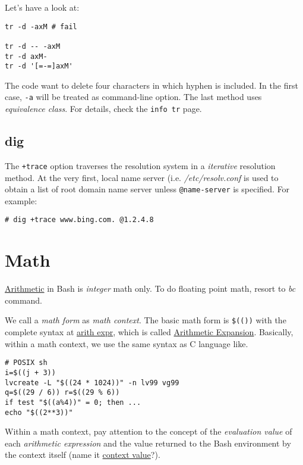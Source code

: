 Let's have a look at:

\begin{lstlisting}
tr -d -axM # fail

tr -d -- -axM
tr -d axM-
tr -d '[=-=]axM'
\end{lstlisting}

The code want to delete four characters in which hyphen is
included. In the first case, \lstinline|-a| will be treated as
command-line option. The last method uses \textit{equivalence
  class}. For details, check the \lstinline|info tr| page.

\subsection{dig}
\label{sec:bash-dig}

The \lstinline|+trace| option traverses the resolution system in a
\textit{iterative} resolution method. At the very first, local
name server (i.e. \textit{/etc/resolv.conf} is used to obtain a
list of root domain name server unless \lstinline|@name-server| is
specified. For example:

\begin{lstlisting}
# dig +trace www.bing.com. @1.2.4.8
\end{lstlisting}

\section{Math}
\label{sec:bash-math}

\href{http://mywiki.wooledge.org/ArithmeticExpression}{Arithmetic}
in Bash is \textit{integer} math only. To do floating point math,
resort to \textit{bc} command.

We call a \textit{math form} as \textit{math context}. The basic
math form is
\lstinline|$(())| with the complete syntax at
\href{https://wiki.bash-hackers.org/syntax/arith_expr}{arith expr},
which is called \uline{Arithmetic Expansion}. Basically, within a
math context, we use the same syntax as C language like.

\begin{minipage}{1.0\linewidth}
\begin{lstlisting}
# POSIX sh
i=$((j + 3))
lvcreate -L "$((24 * 1024))" -n lv99 vg99
q=$((29 / 6)) r=$((29 % 6))
if test "$((a%4))" = 0; then ...
echo "$((2**3))"
\end{lstlisting}
\end{minipage}

Within a math context, pay attention to the concept of the
\textit{evaluation value} of each \textit{arithmetic expression}
and the value returned to the Bash environment by the context
itself (name it \uline{context value}?).

